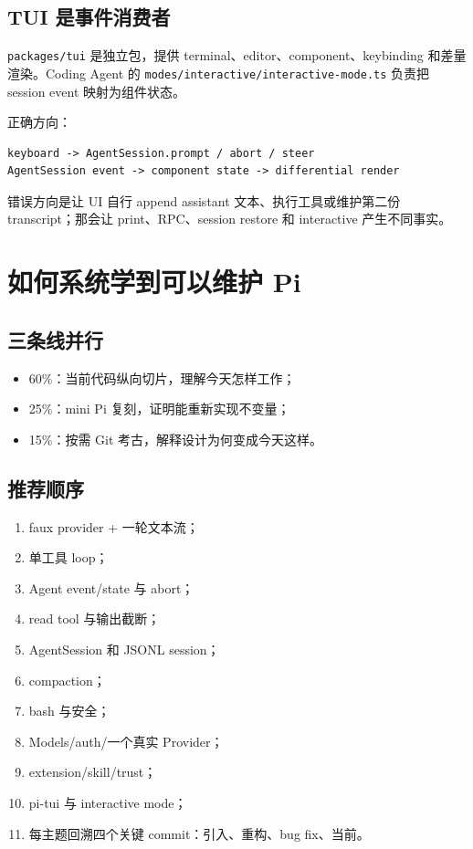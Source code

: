 \documentclass[UTF8,openany,11pt]{ctexbook}
\newcommand{\pathref}[1]{\texttt{#1}}
\begin{document}
\section{TUI 是事件消费者}
\pathref{packages/tui} 是独立包，提供 terminal、editor、component、keybinding 和差量渲染。Coding Agent 的 \pathref{modes/interactive/interactive-mode.ts} 负责把 session event 映射为组件状态。

正确方向：
\begin{Verbatim}[fontsize=\small]
keyboard -> AgentSession.prompt / abort / steer
AgentSession event -> component state -> differential render
\end{Verbatim}
错误方向是让 UI 自行 append assistant 文本、执行工具或维护第二份 transcript；那会让 print、RPC、session restore 和 interactive 产生不同事实。

\chapter{如何系统学到可以维护 Pi}

\section{三条线并行}
\begin{itemize}
\item 60\%：当前代码纵向切片，理解今天怎样工作；
\item 25\%：mini Pi 复刻，证明能重新实现不变量；
\item 15\%：按需 Git 考古，解释设计为何变成今天这样。
\end{itemize}

\section{推荐顺序}
\begin{enumerate}
\item faux provider + 一轮文本流；
\item 单工具 loop；
\item Agent event/state 与 abort；
\item read tool 与输出截断；
\item AgentSession 和 JSONL session；
\item compaction；
\item bash 与安全；
\item Models/auth/一个真实 Provider；
\item extension/skill/trust；
\item pi-tui 与 interactive mode；
\item 每主题回溯四个关键 commit：引入、重构、bug fix、当前。
\end{enumerate}
\end{document}
